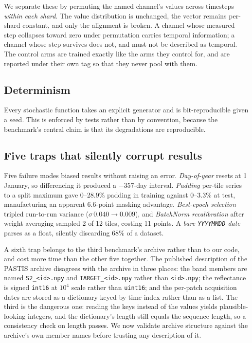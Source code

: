 \documentclass[journal]{IEEEtran}
\begin{document}
We separate these by permuting the named channel's values across timesteps
\emph{within each shard}. The value distribution is unchanged, the vector
remains per-shard constant, and only the alignment is broken. A channel whose
measured step collapses toward zero under permutation carries temporal
information; a channel whose step survives does not, and must not be described
as temporal. The control arms are trained exactly like the arms they control
for, and are reported under their own tag so that they never pool with them.

\subsection{Determinism}
Every stochastic function takes an explicit generator and is bit-reproducible
given a seed. This is enforced by tests rather than by convention, because the
benchmark's central claim is that its degradations are reproducible.

\subsection{Five traps that silently corrupt results}
Five failure modes biased results without raising an error.
\emph{Day-of-year} resets at 1 January, so differencing it produced a
$-357$-day interval. \emph{Padding} per-tile series to a split maximum gave
0--28.9\% padding in training against 0--3.3\% at test, manufacturing an
apparent 6.6-point masking advantage. \emph{Best-epoch selection} tripled
run-to-run variance ($\sigma\,0.040 \to 0.009$), and \emph{BatchNorm
recalibration} after weight averaging sampled 2 of 12 tiles, costing 11 points.
A \emph{bare \texttt{YYYYMMDD} date} parses as a float, silently discarding
68\% of a dataset.

A sixth trap belongs to the third benchmark's archive rather than to our code,
and cost more time than the other five together. The published description of
the PASTIS archive disagrees with the archive in three places: the band members
are named \texttt{S2\_<id>.npy} and \texttt{TARGET\_<id>.npy} rather than
\texttt{<id>.npy}; the reflectance is signed \texttt{int16} at $10^{4}$ scale
rather than \texttt{uint16}; and the per-patch acquisition dates are stored as a
dictionary keyed by time index rather than as a list. The third is the dangerous
one: reading the keys instead of the values yields plausible-looking integers,
and the dictionary's length still equals the sequence length, so a consistency
check on length passes. We now validate archive structure against the archive's
own member names before trusting any description of it.
\end{document}
